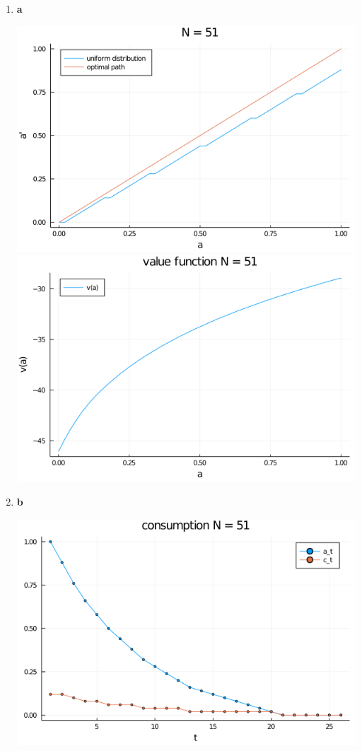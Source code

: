 \documentclass[12pt]{article}
\begin{document}
\begin{enumerate}
	\item
		\begin{center}
			\textbf{a}\par\medskip
			\includegraphics[width=0.8\linewidth]{plot_a2.png}
			\includegraphics[width=0.8\linewidth]{plot_v2.png}
		\end{center}
	\item 

		\begin{center}
			\textbf{b}\par\medskip
			\includegraphics[width=0.8\linewidth]{plot_c2.png}
		\end{center}
\end{enumerate}

\end{document}
